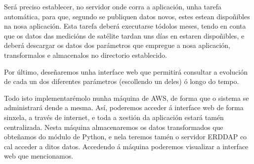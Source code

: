Será preciso establecer, no servidor onde corra a aplicación, unha tarefa automática, para que, segundo se publiquen datos novos, estes estean dispoñibles na nosa aplicación. Esta tarefa
deberá executarse tódolos meses, tendo en conta que os datos das medicións de satélite tardan uns días en estaren dispoñibles, e deberá descargar os datos dos parámetros que empregue a
nosa aplicación, transformalos e almacenalos no directorio establecido.

Por último, deseñaremos unha interface web que permitirá consultar a evolución de cada un dos diferentes parámetros (escollendo un deles) ó longo do tempo.

Todo isto implementarémolo nunha máquina de AWS, de forma que o sistema se administrará dende a mesma. Así, poderemos acceder á interface web de forma sinxela, a través de internet,
e toda a xestión da aplicación estará tamén centralizada. Nesta máquina almacenaremos os datos transformados que obteñamos do módulo de Python, e nela teremos tamén o servidor ERDDAP
co cal acceder a ditos datos. Accedendo á máquina poderemos visualizar a interface web que mencionamos.
